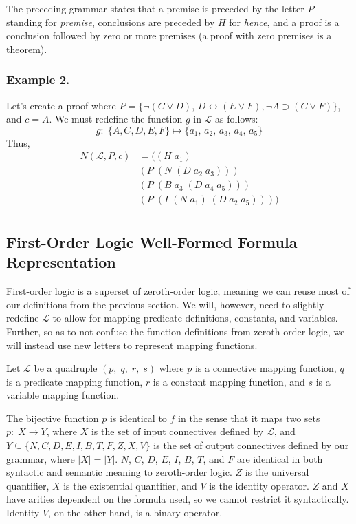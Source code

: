 \documentclass[ms]{uncgdissertationexp2}
\theoremstyle{plain}
\theoremstyle{definition}
\theoremstyle{remark}
\begin{document}
The preceding grammar states that a premise is preceded by the letter $P$ standing for \textit{premise}, conclusions are preceded by $H$ for \textit{hence}, and a proof is a conclusion followed by zero or more premises (a proof with zero premises is a theorem).\\

\subsubsection{Example 2.}
Let's create a proof where $P = \{\lnot(C \lor D),\,D \leftrightarrow (E \lor F), \lnot A \supset (C \lor F)\}$, and $c = A$. We must redefine the function $g$ in $\mathcal{L}$ as follows:
\[
    g:\;\{A, C, D, E, F\} \mapsto \{a_1,\,a_2,\,a_3,\,a_4,\,a_5\}
\]
\noindent Thus, 
\begin{align*}
    N(\mathcal{L}, P, c) &= ((H\;a_1)\;\\
    &(P\;(N\;(D\;a_2\;a_3)))\\
    &(P\;(B\;a_3\;(D\;a_4\;a_5)))\\
    &(P\;(I\;(N\;a_1)\;(D\;a_2\;a_5))))\\
\end{align*}
\subsection{First-Order Logic Well-Formed Formula Representation}

First-order logic is a superset of zeroth-order logic, meaning we can reuse most of our definitions from the previous section. We will, however, need to slightly redefine $\mathcal{L}$ to allow for mapping predicate definitions, constants, and variables. Further, so as to not confuse the function definitions from zeroth-order logic, we will instead use new letters to represent mapping functions.

Let $\mathcal{L}$ be a quadruple $(p,\;q,\;r,\;s)$ where $p$ is a connective mapping function, $q$ is a predicate mapping function, $r$ is a constant mapping function, and $s$ is a variable mapping function. 

The bijective function $p$ is identical to $f$ in the sense that it maps two sets $p:\;X \to Y$, where $X$ is the set of input connectives defined by $\mathcal{L}$, and $Y \subseteq \{N, C, D, E, I, B, T, F, Z, X, V\}$ is the set of output connectives defined by our grammar, where $|X| = |Y|$. $N$, $C$, $D$, $E$, $I$, $B$, $T$, and $F$ are identical in both syntactic and semantic meaning to zeroth-order logic. $Z$ is the universal quantifier, $X$ is the existential quantifier, and $V$ is the identity operator. $Z$ and $X$ have arities dependent on the formula used, so we cannot restrict it syntactically. Identity $V$, on the other hand, is a binary operator.
\end{document}
